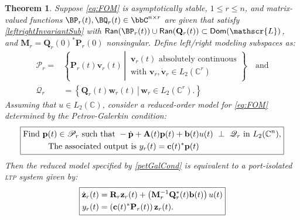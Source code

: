 \documentclass[pdflatex,sn-mathphys-num]{sn-jnl}%
\theoremstyle{thmstyleone}%
\newtheorem{theorem}{Theorem}%
\theoremstyle{thmstyletwo}%
\theoremstyle{thmstylethree}%
\begin{document}
\begin{theorem} \label{petrGalerkInvSub}
Suppose \eqref{eq:FOM} is asymptotically stable, $1\leq r\leq n$, and matrix-valued functions $\BP_r(t), \BQ_r(t)\in \bbC^{n\times r}$ are given that satisfy \eqref{leftrightInvariantSub} with $\mathsf{Ran}(\BP_r(t))\cup\mathsf{Ran}(\mathbf{Q}_r(t))\subset\mathsf{Dom}(\mathscr{L})$, and $\mathbf{M}_r=\mathbf{Q}_r(0)^{*}\mathbf{P}_r(0)$ nonsingular. Define left/right modeling subspaces as:
\begin{equation}
    \begin{aligned}
        \mathscr{P}_r=&\left\{\mathbf{P}_r(t)\mathbf{v}_r(t)\,\left|\,\begin{matrix}
        \mathbf{v}_r(t)\mbox{ absolutely continuous}\\
            \mbox{with } \mathbf{v}_r ,\dot{\mathbf{v}}_r\in L_2(\mathbb{C}^r)
        \end{matrix} \right.\right\}\quad\mbox{and}\\
        \mathscr{Q}_r&=\left\{\mathbf{Q}_r(t)\mathbf{w}_r(t)\,\left|\, \mathbf{w}_r \in L_2(\mathbb{C}^r).
\right.\right\}
    \end{aligned}
\end{equation}
Assuming that $u\in L_2(\mathbb{C})$,  consider a reduced-order model for \eqref{eq:FOM} determined by the Petrov-Galerkin condition: 
\begin{equation} \label{petGalCond}
\fbox{$\begin{aligned}
    \mbox{Find }\mathbf{p}(t)\in \mathscr{P}_r \mbox{ such that }
    -\dot{\mathbf{p}}+\mathbf{A}(t)\mathbf{p}(t)+\mathbf{b}(t)&u(t)\ \perp \  \mathscr{Q}_r\mbox{ in }L_2(\mathbb{C}^n),\\
    \mbox{The associated output is }y_r(t)=\mathbf{c}(t)^*\mathbf{p}(t)&
\end{aligned}$}
\end{equation}
Then the reduced model specified by \eqref{petGalCond} is equivalent to a port-isolated \textsc{ltp} system given by: 
\begin{equation} \label{ProjLTPModel}
 \fbox{$\begin{aligned}
    \dot{\mathbf{z}}_r(t) &= \mathbf{R}_r \mathbf{z}_r(t) + \left(\mathbf{M}_r^{-1}\mathbf{Q}_r^{*}(t)\mathbf{b}(t)\right) {u}(t)\\
		{y}_r(t) &= \left(\mathbf{c}(t)^* \mathbf{P}_r(t)\right) \mathbf{z}_r(t).
    \end{aligned}$}
\end{equation}
\end{theorem}
\end{document}
